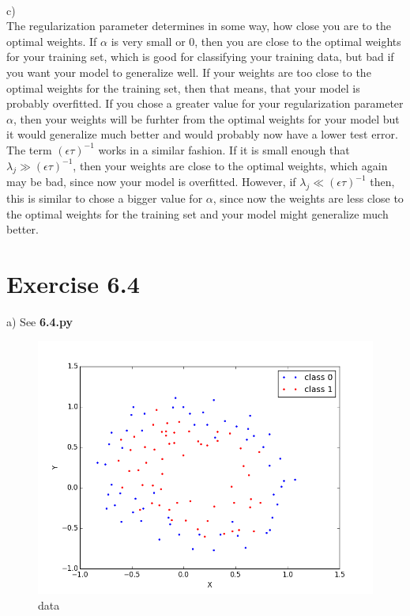 \documentclass{article}
\begin{document}
\\
c)\\
The regularization parameter determines in some way, how close you are to the optimal weights. If $\alpha$ is very small or 0, then you are close to the optimal weights for your training set, which is good for classifying your training data, but bad if you want your model to generalize well. If your weights are too close to the optimal weights for the training set, then that means, that your model is probably overfitted. If you chose a greater value for your regularization parameter $\alpha$, then your weights will be furhter from the optimal weights for your model but it would generalize much better and would probably now have a lower test error.\\
The term $(\epsilon \tau)^{-1}$ works in a similar fashion. If it is small enough that $\lambda_j \gg (\epsilon \tau)^{-1}$, then your weights are close to the optimal weights, which again may be bad, since now your model is overfitted. However, if $\lambda_j \ll (\epsilon \tau)^{-1}$ then, this is similar to chose a bigger value for $\alpha$, since now the weights are less close to the optimal weights for the training set and your model might generalize much better.

\section*{Exercise 6.4}
a) See \textbf{6.4.py}\\
\begin{figure}[ht]
	\centering
	\includegraphics[scale=0.35]{64a.png}
	\caption{data}
\end{figure}
\end{document}
